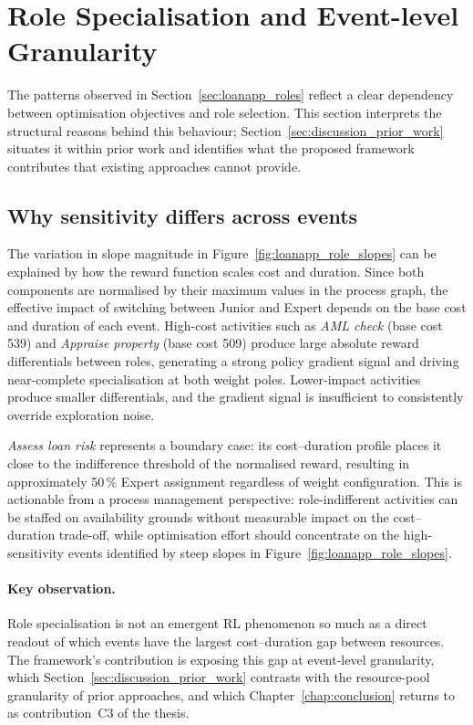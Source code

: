 \section{Role Specialisation and Event-level Granularity}
\label{sec:discussion_roles}

The patterns observed in Section~\ref{sec:loanapp_roles} reflect a clear dependency between optimisation objectives and role selection. This section interprets the structural reasons behind this behaviour; Section~\ref{sec:discussion_prior_work} situates it within prior work and identifies what the proposed framework contributes that existing approaches cannot provide.

\subsection{Why sensitivity differs across events}

The variation in slope magnitude in Figure~\ref{fig:loanapp_role_slopes} can be explained by how the reward function scales cost and duration. Since both components are normalised by their maximum values in the process graph, the effective impact of switching between Junior and Expert depends on the base cost and duration of each event. High-cost activities such as \textit{AML check} (base cost 539) and \textit{Appraise property} (base cost 509) produce large absolute reward differentials between roles, generating a strong policy gradient signal and driving near-complete specialisation at both weight poles. Lower-impact activities produce smaller differentials, and the gradient signal is insufficient to consistently override exploration noise.

\textit{Assess loan risk} represents a boundary case: its cost--duration profile places it close to the indifference threshold of the normalised reward, resulting in approximately 50\,\% Expert assignment regardless of weight configuration. This is actionable from a process management perspective: role-indifferent activities can be staffed on availability grounds without measurable impact on the cost--duration trade-off, while optimisation effort should concentrate on the high-sensitivity events identified by steep slopes in Figure~\ref{fig:loanapp_role_slopes}.

\paragraph{Key observation.} Role specialisation is not an emergent RL phenomenon so much as a direct readout of which events have the largest cost--duration gap between resources. The framework's contribution is exposing this gap at event-level granularity, which Section~\ref{sec:discussion_prior_work} contrasts with the resource-pool granularity of prior approaches, and which Chapter~\ref{chap:conclusion} returns to as contribution~C3 of the thesis.

